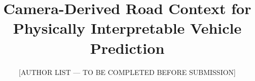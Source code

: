 \documentclass[preprint,12pt]{elsarticle}
\begin{document}
\begin{frontmatter}

\title{Camera-Derived Road Context for Physically Interpretable Vehicle Prediction}

\author[uf]{[AUTHOR LIST --- TO BE COMPLETED BEFORE SUBMISSION]}



\end{frontmatter}
\end{document}

